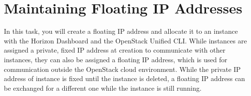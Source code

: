 \documentclass[letterpaper, 12pt]{article}
\begin{document}
\section{Maintaining Floating IP Addresses}\label{sec:maintaining-floating-ip-addresses}
In this task, you will create a floating IP address and allocate it to an instance with the Horizon Dashboard and the OpenStack Unified CLI.
While instances are assigned a private, fixed IP address at creation to communicate with other instances, they can also be assigned a floating IP address, which is used for communication outside the OpenStack cloud environment.
While the private IP address of instance is fixed until the instance is deleted, a floating IP address can be exchanged for a different one while the instance is still running.
\end{document}
